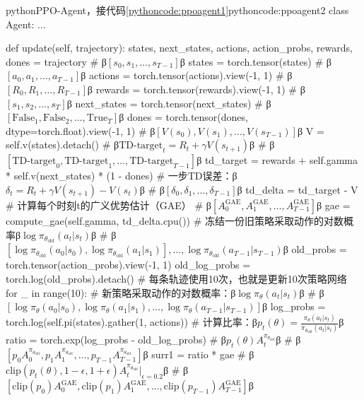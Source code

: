 \documentclass[lang=cn,newtx,10pt,scheme=chinese]{elegantbook}
\begin{document}
\begin{codebox}{python}{PPO-Agent，接代码\ref{pythoncode:ppoagent1}}{pythoncode:ppoagent2}
class Agent:
    ...

    def update(self, trajectory):
        states, next_states, actions, action_probs, rewards, dones = trajectory
        # β$[s_0,s_1,\dots,s_{T-1}]$β
        states = torch.tensor(states)
        # β$[a_0,a_1,\dots,a_{T-1}]$β
        actions = torch.tensor(actions).view(-1, 1)
        # β$[R_0,R_1,\dots,R_{T-1}]$β
        rewards = torch.tensor(rewards).view(-1, 1)
        # β$[s_1,s_2,\dots,s_T]$β
        next_states = torch.tensor(next_states)
        # β$[\text{False}_1, \text{False}_2, \dots, \text{True}_T]$β
        dones = torch.tensor(dones, dtype=torch.float).view(-1, 1)
        # β$[V(s_0),V(s_1),\dots,V(s_{T-1})]$β
        V = self.v(states).detach()
        # β$\text{TD-target}_t=R_t+\gamma V(s_{t+1})$β
        # β$[\text{TD-target}_0, \text{TD-target}_1, \dots, \text{TD-target}_{T-1}]$β
        td_target = rewards + self.gamma * self.v(next_states) * (1 - dones)
        # 一步TD误差：β$\delta_t=R_t+\gamma V(s_{t+1})-V(s_t)$β
        # β$[\delta_0, \delta_1, \dots, \delta_{T-1}]$β
        td_delta = td_target - V
        # 计算每个时刻t的广义优势估计（GAE）
        # β$[A^{\text{GAE}}_0,A^{\text{GAE}}_1,\dots,A^{\text{GAE}}_{T-1}]$β
        gae = compute_gae(self.gamma, td_delta.cpu())
        # 冻结一份旧策略采取动作的对数概率β$\log{\pi_{\theta_\text{old}}(a_t|s_t)}$β
        # β$[\log{\pi_{\theta_\text{old}}(a_0|s_0)},\log{\pi_{\theta_\text{old}}(a_1|s_1)}],\dots,\log{\pi_{\theta_\text{old}}(a_{T-1}|s_{T-1})}$β
        old_probs = torch.tensor(action_probs).view(-1, 1)
        old_log_probs = torch.log(old_probs).detach()
        # 每条轨迹使用10次，也就是更新10次策略网络
        for _ in range(10):
            # 新策略采取动作的对数概率：β$\log{\pi_\theta(a_t|s_t)}$β
            # β$[\log{\pi_\theta(a_0|s_0)},\log{\pi_\theta(a_1|s_1)},\dots,\log{\pi_\theta(a_{T-1}|s_{T-1})}]$β
            log_probs = torch.log(self.pi(states).gather(1, actions))
            # 计算比率：β$p_t(\theta)=\frac{\pi_\theta(a_t|s_t)}{\pi_{\theta_\text{old}}(a_t|s_t)}$β
            ratio = torch.exp(log_probs - old_log_probs)
            # β$p_t(\theta)A^{\pi_{\theta_\text{old}}}_t$β
            # β$[p_0A^{\pi_{\theta_\text{old}}}_0,p_1A^{\pi_{\theta_\text{old}}}_1,\dots,p_{T-1}A^{\pi_{\theta_\text{old}}}_{T-1}]$β
            surr1 = ratio * gae
            # β$\text{clip}(p_t(\theta),1-\epsilon,1+\epsilon)A^{\pi_{\theta_\text{old}}}_t|_{\epsilon=0.2}$β
            # β$[\text{clip}(p_0)A^{\text{GAE}}_0,\text{clip}(p_1)A^{\text{GAE}}_1,\dots,\text{clip}(p_{T-1})A^{\text{GAE}}_{T-1}]$β

\end{codebox}
\end{document}
